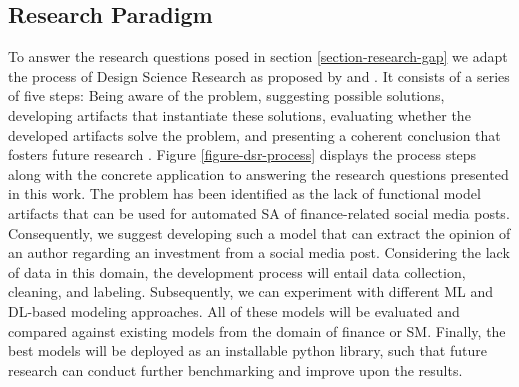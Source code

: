 \subsection{Research Paradigm}

To answer the research questions posed in section \ref{section-research-gap} we adapt the process of Design Science Research as proposed by  and . It consists of a series of five steps: Being aware of the problem, suggesting possible solutions, developing artifacts that instantiate these solutions, evaluating whether the developed artifacts solve the problem, and presenting a coherent conclusion that fosters future research \cite{kuechler2012dsrprocess}. Figure \ref{figure-dsr-process} displays the process steps along with the concrete application to answering the research questions presented in this work.\newline
The problem has been identified as the lack of functional model artifacts that can be used for automated SA of finance-related social media posts. Consequently, we suggest developing such a model that can extract the opinion of an author regarding an investment from a social media post. Considering the lack of data in this domain, the development process will entail data collection, cleaning, and labeling. Subsequently, we can experiment with different ML and DL-based modeling approaches. All of these models will be evaluated and compared against existing models from the domain of finance or SM. Finally, the best models will be deployed as an installable python library, such that future research can conduct further benchmarking and improve upon the results.











